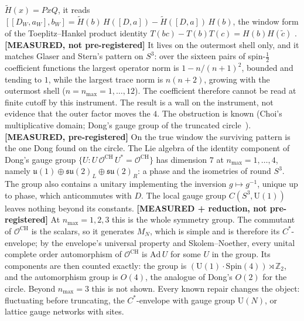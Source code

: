 \documentclass[11pt]{article}
\begin{document}
$\tilde H(x) = PxQ$, it reads $[[D_W,a_W],b_W] = \tilde H(b)\,H([D,a]) -
\tilde H([D,a])\,H(b)$, the window form of the Toeplitz--Hankel product
identity $T(bc) - T(b)T(c) = H(b)H(\tilde c)$ \cite{boettcher2000}.
\textbf{[MEASURED, not pre-registered]} It lives on the outermost shell
only, and it matches Glaser and Stern's pattern on $S^3$: over the
sixteen pairs of spin-$\tfrac12$ coefficient functions the largest
operator norm is $1 - n/(n+1)^2$, bounded and tending to $1$, while the
largest trace norm is $n(n+2)$, growing with the outermost shell
($n = n_{\max} = 1, \dots, 12$). The
coefficient therefore cannot be read at finite cutoff by this
instrument. The result is a wall on the instrument, not evidence that
the outer factor moves the $4$. The obstruction is known (Choi's
multiplicative domain; Dong's gauge group of the truncated
circle~\cite{dong2022}). \textbf{[MEASURED, pre-registered]} On the true window
the surviving pattern is the one Dong found on the circle.
The Lie algebra of the identity component of Dong's gauge group
$\{U : U\,\mathcal{O}^{\mathrm{CH}}\,U^* = \mathcal{O}^{\mathrm{CH}}\}$
has dimension $7$ at $n_{\max} = 1, \dots, 4$, namely
$\mathfrak{u}(1) \oplus \mathfrak{su}(2)_L \oplus \mathfrak{su}(2)_R$:
a phase and the isometries of round $S^3$. The group also contains a
unitary implementing the inversion $g \mapsto g^{-1}$, unique up to
phase, which anticommutes with $D$. The local gauge group
$C(S^3, \mathrm{U}(1))$ leaves nothing beyond its constants.
\textbf{[MEASURED + reduction, not pre-registered]} At
$n_{\max} = 1, 2, 3$ this is the whole symmetry group.  The commutant of
$\mathcal{O}^{\mathrm{CH}}$ is the scalars, so it generates $M_N$, which
is simple and is therefore its $C^*$-envelope; by the envelope's
universal property \cite{connes_vs2021} and Skolem--Noether, every unital
complete order automorphism of $\mathcal{O}^{\mathrm{CH}}$ is
$\mathrm{Ad}\,U$ for some $U$ in the group.  Its components are then
counted exactly: the group is $(\mathrm{U}(1)\cdot\mathrm{Spin}(4))
\rtimes \mathbb{Z}_2$, and the automorphism group is $O(4)$, the
analogue of Dong's $O(2)$ for the circle.  Beyond $n_{\max} = 3$ this is
not shown.  Every known repair changes the object: fluctuating before truncating,
the $C^*$-envelope with gauge group $\mathrm{U}(N)$, or lattice gauge
networks with sites.
\end{document}
